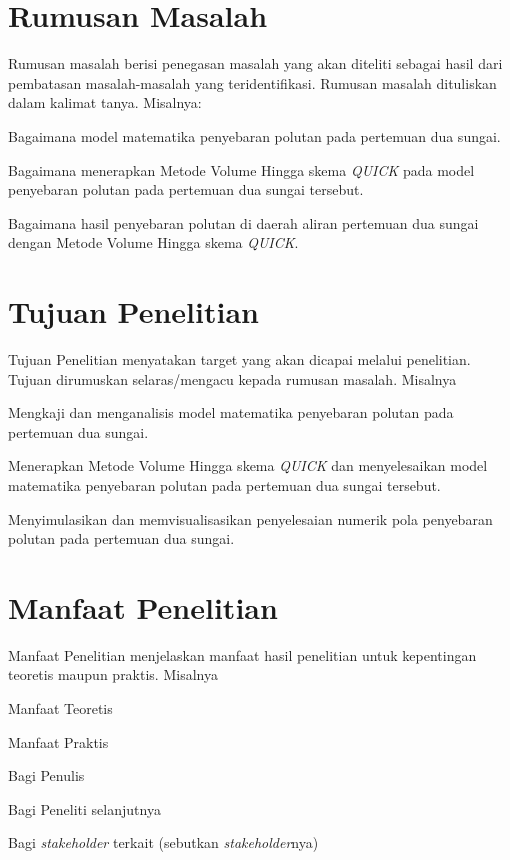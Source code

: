 \section{Rumusan Masalah}
Rumusan masalah berisi penegasan masalah yang akan diteliti sebagai hasil dari pembatasan masalah-masalah yang teridentifikasi. Rumusan masalah dituliskan dalam kalimat tanya. Misalnya:
\begin{daftar}
	\item Bagaimana model matematika penyebaran polutan pada pertemuan dua sungai.
	\item Bagaimana menerapkan Metode Volume Hingga skema \textit{QUICK} pada model penyebaran polutan pada pertemuan dua sungai tersebut.
	\item Bagaimana hasil penyebaran polutan di daerah aliran pertemuan dua sungai dengan Metode Volume Hingga skema \textit{QUICK}.
\end{daftar}

\section{Tujuan Penelitian}
Tujuan Penelitian menyatakan target yang akan dicapai melalui penelitian. Tujuan dirumuskan selaras/mengacu kepada rumusan masalah. Misalnya
\begin{daftar}
	\item Mengkaji dan menganalisis model matematika penyebaran polutan pada pertemuan dua sungai.	
	\item Menerapkan Metode Volume Hingga skema \textit{QUICK} dan menyelesaikan model matematika penyebaran polutan pada pertemuan dua sungai tersebut.
	\item Menyimulasikan dan memvisualisasikan penyelesaian numerik pola penyebaran polutan pada pertemuan dua sungai.
\end{daftar}

\section{Manfaat Penelitian}
Manfaat Penelitian menjelaskan manfaat hasil penelitian untuk kepentingan teoretis maupun praktis. Misalnya
\begin{daftar}
	\item Manfaat Teoretis 
	\item Manfaat Praktis
	\begin{daftar}
		\item Bagi Penulis
		\item Bagi Peneliti selanjutnya
		\item Bagi \textit{stakeholder} terkait (sebutkan \textit{stakeholder}nya)
	\end{daftar}
\end{daftar}

